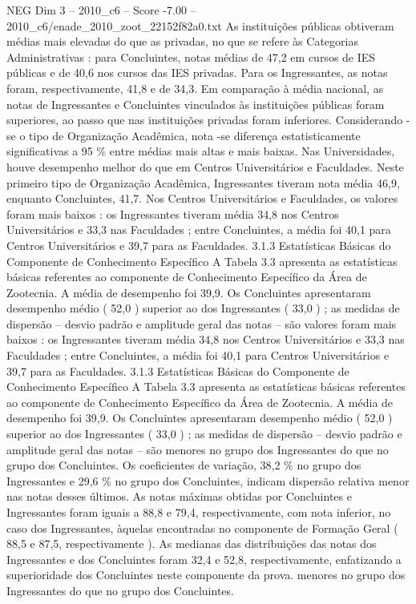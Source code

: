 \begin{textsample}{NEG Dim 3 – 2010\_c6 – Score -7.00 – 2010\_c6/enade\_2010\_zoot\_22152f82a0.txt}
As instituições públicas obtiveram médias mais elevadas do que as privadas, no que se refere às Categorias Administrativas : para Concluintes, notas médias de 47,2 em cursos de IES públicas e de 40,6 nos cursos das IES privadas.
Para os Ingressantes, as notas foram, respectivamente, 41,8 e de 34,3.
Em comparação à média nacional, as notas de Ingressantes e Concluintes vinculados às instituições públicas foram superiores, ao passo que nas instituições privadas foram inferiores.
Considerando -se o tipo de Organização Acadêmica, nota -se diferença estatisticamente significativas a 95 \% entre médias mais altas e mais baixas.
Nas Universidades, houve desempenho melhor do que em Centros Universitários e Faculdades.
Neste primeiro tipo de Organização Acadêmica, Ingressantes tiveram nota média 46,9, enquanto Concluintes, 41,7.
Nos Centros Universitários e Faculdades, os valores foram mais baixos : os Ingressantes tiveram média 34,8 nos Centros Universitários e 33,3 nas Faculdades ; entre Concluintes, a média foi 40,1 para Centros Universitários e 39,7 para as Faculdades. 3.1.3 Estatísticas Básicas do Componente de Conhecimento Específico A Tabela 3.3 apresenta as estatísticas básicas referentes ao componente de Conhecimento Específico da Área de Zootecnia.
A média de desempenho foi 39,9.
Os Concluintes apresentaram desempenho médio ( 52,0 ) superior ao dos Ingressantes ( 33,0 ) ; as medidas de dispersão – desvio padrão e amplitude geral das notas – são valores foram mais baixos : os Ingressantes tiveram média 34,8 nos Centros Universitários e 33,3 nas Faculdades ; entre Concluintes, a média foi 40,1 para Centros Universitários e 39,7 para as Faculdades. 3.1.3 Estatísticas Básicas do Componente de Conhecimento Específico A Tabela 3.3 apresenta as estatísticas básicas referentes ao componente de Conhecimento Específico da Área de Zootecnia.
A média de desempenho foi 39,9.
Os Concluintes apresentaram desempenho médio ( 52,0 ) superior ao dos Ingressantes ( 33,0 ) ; as medidas de dispersão – desvio padrão e amplitude geral das notas – são menores no grupo dos Ingressantes do que no grupo dos Concluintes.
Os coeficientes de variação, 38,2 \% no grupo dos Ingressantes e 29,6 \% no grupo dos Concluintes, indicam dispersão relativa menor nas notas desses últimos.
As notas máximas obtidas por Concluintes e Ingressantes foram iguais a 88,8 e 79,4, respectivamente, com nota inferior, no caso dos Ingressantes, àquelas encontradas no componente de Formação Geral ( 88,5 e 87,5, respectivamente ).
As medianas das distribuições das notas dos Ingressantes e dos Concluintes foram 32,4 e 52,8, respectivamente, enfatizando a superioridade dos Concluintes neste componente da prova. menores no grupo dos Ingressantes do que no grupo dos Concluintes.

\end{textsample}

